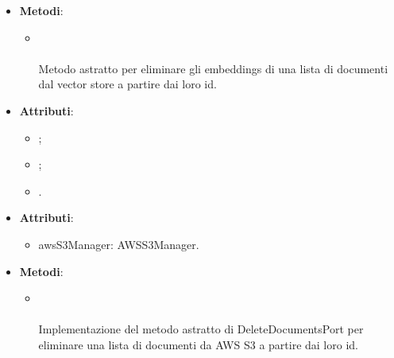\documentclass[10pt, a4paper]{article}
\begin{document}
\label{DeleteEmbeddingsPortDettaglio}
\begin{itemize}
    \item \textbf{Metodi}:
    \begin{itemize}
        \item {}\\ \\
        Metodo astratto per eliminare gli embeddings di una lista di documenti dal vector store a partire dai loro id.
    \end{itemize}
\end{itemize}

\label{DocumentOperationResponseDettaglio}
\begin{itemize}
    \item \textbf{Attributi}:
    \begin{itemize}
        \item {};
        \item {};
        \item {}.
    \end{itemize}
\end{itemize}

\label{DeleteDocumentsAWSS3Dettaglio}
\begin{itemize}
    \item \textbf{Attributi}:
    \begin{itemize}
        \item awsS3Manager: AWSS3Manager.
    \end{itemize}
    \item \textbf{Metodi}:
    \begin{itemize}
        \item {}\\ \\
        Implementazione del metodo astratto di DeleteDocumentsPort per eliminare una lista di documenti da AWS S3 a partire dai loro id.
    \end{itemize}
\end{itemize}
\end{document}

